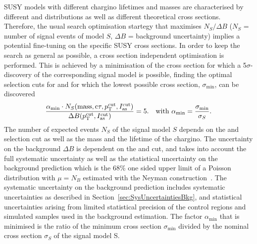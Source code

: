 SUSY models with different chargino lifetimes and masses are characterised by different \pt and \ias distributions as well as different theoretical cross sections.
Therefore, the usual search optimisation startegy that maximises $N_S/\Delta B$ ($N_S$ = number of signal events of model $S$, $\Delta B$ = background uncertainty) implies a potential fine-tuning on the specific SUSY cross sections.
In order to keep the search as general as possible, a cross section independent optimisation is performed.
This is achieved by a minimisation of the cross section for which a 5$\sigma$-discovery of the corresponding signal model is possible, \ie finding the optimal selection cuts for \pt and \ias for which the lowest possible cross section, $\sigma_{\text{min}}$, can be discovered
\begin{align}
\label{eq:optimisation}
\frac{\alpha_{\text{min}} \cdot N_S(\text{mass},\text{c}\tau,p_{\text{T}}^{\text{cut}}, I_{\text{as}}^{\text{cut}})}{\Delta B (p_{\text{T}}^{\text{cut}}, I_{\text{as}}^{\text{cut}})} = 5. && \text{with   } \alpha_{\text{min}} = \frac{\sigma_{\text{min}}}{\sigma_{S}}.
\end{align}
The number of expected events $N_S$ of the signal model $S$ depends on the \pt and \ias selection cut as well as the mass and the lifetime of the chargino.
The uncertainty on the background $\Delta B$ is dependent on the \pt and \ias cut, and takes into account the full systematic uncertainty as well as the statistical uncertainty on the background prediction which is the 68\% one sided upper limit of a Poisson distribution with $\mu = N_B$ estimated with the Neyman construction~\cite{bib:Neyman_1937,bib:PDG_2014}.
The systematic uncertainty on the background prediction includes systematic uncertainties as described in Section~\ref{sec:SysUncertaintiesBkg}, and statistical uncertainties arising from limited statistical precision of the control regions and simulated samples used in the background estimation.
The factor $\alpha_{\text{min}}$  that is minimised is the ratio of the minimum cross section $\sigma_{\text{min}}$ divided by the nominal cross section $\sigma_{S}$ of the signal model S.\\

